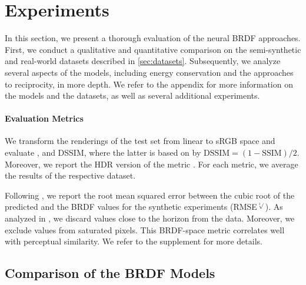 \section{Experiments}

In this section, we present a thorough evaluation of the neural BRDF approaches. 
First, we conduct a qualitative and quantitative comparison on the semi-synthetic and real-world datasets described in \cref{sec:datasets}. Subsequently, we analyze several aspects of the models, including energy conservation and the approaches to reciprocity, in more depth.
We refer to the appendix for more information on the models and the datasets, as well as several additional experiments.

\paragraph{Evaluation Metrics}

We transform the renderings of the test set from linear to sRGB space and evaluate  \psnr, \lpipsc and DSSIM, where the latter is based on \ssimc by $\text{DSSIM} = (1-\text{SSIM})/2$. Moreover, we report the HDR version of the \FLIP metric \cite{Andersson2021HDRFLIP,Andersson2020FLIP}. For each metric, we average the results of the respective dataset.

Following \cite{Lavoue21PerceptualQualityOfBRDFApproximations}, we 
report the root mean squared error between the cubic root of the predicted and the \gt BRDF values for the synthetic experiments (RMSE$^{\sqrt[3]{}}$). As analyzed in \cite{Lavoue21PerceptualQualityOfBRDFApproximations}, we discard values close to the horizon from the data. Moreover, we exclude values from saturated pixels. 
This BRDF-space metric correlates well with perceptual similarity. 
We refer to the supplement for more details.


\subsection{Comparison of the BRDF Models}
\label{sec:comparison_brdf_models}



